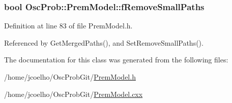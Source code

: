 \subsubsection[{\texorpdfstring{f\+Remove\+Small\+Paths}{fRemoveSmallPaths}}]{\setlength{\rightskip}{0pt plus 5cm}bool Osc\+Prob\+::\+Prem\+Model\+::f\+Remove\+Small\+Paths\hspace{0.3cm}{\ttfamily [protected]}}\hypertarget{classOscProb_1_1PremModel_a3973df6f5f2ff219cd2f865b31aacfd2}{}\label{classOscProb_1_1PremModel_a3973df6f5f2ff219cd2f865b31aacfd2}


Definition at line 83 of file Prem\+Model.\+h.



Referenced by Get\+Merged\+Paths(), and Set\+Remove\+Small\+Paths().



The documentation for this class was generated from the following files\+:\begin{DoxyCompactItemize}
\item 
/home/jcoelho/\+Osc\+Prob\+Git/\hyperlink{PremModel_8h}{Prem\+Model.\+h}\item 
/home/jcoelho/\+Osc\+Prob\+Git/\hyperlink{PremModel_8cxx}{Prem\+Model.\+cxx}\end{DoxyCompactItemize}
